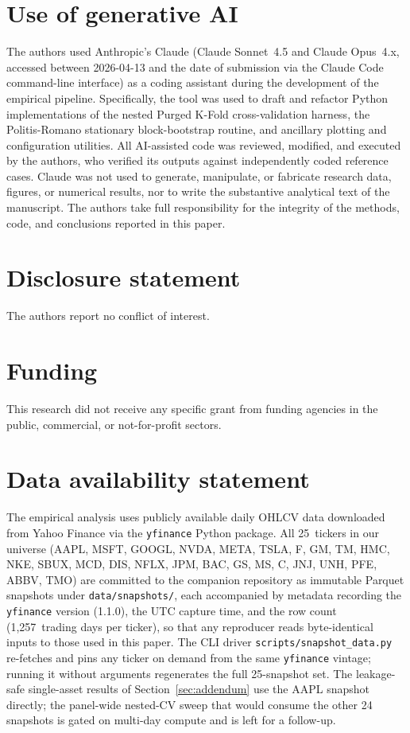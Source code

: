 \documentclass{rQUF2e}
\begin{document}
\section*{Use of generative AI}

The authors used Anthropic's Claude (Claude Sonnet~4.5 and Claude
Opus~4.x, accessed between 2026-04-13 and the date of submission
via the Claude Code command-line interface) as a coding assistant
during the development of the empirical pipeline. Specifically,
the tool was used to draft and refactor Python implementations of
the nested Purged K-Fold cross-validation harness, the
Politis-Romano stationary block-bootstrap routine, and ancillary
plotting and configuration utilities. All AI-assisted code was
reviewed, modified, and executed by the authors, who verified its
outputs against independently coded reference cases. Claude was
not used to generate, manipulate, or fabricate research data,
figures, or numerical results, nor to write the substantive
analytical text of the manuscript. The authors take full
responsibility for the integrity of the methods, code, and
conclusions reported in this paper.

\section*{Disclosure statement}

The authors report no conflict of interest.

\section*{Funding}

This research did not receive any specific grant from funding
agencies in the public, commercial, or not-for-profit sectors.

\section*{Data availability statement}

The empirical analysis uses publicly available daily OHLCV data
downloaded from Yahoo Finance via the \texttt{yfinance} Python
package. All 25~tickers in our universe (AAPL, MSFT, GOOGL, NVDA,
META, TSLA, F, GM, TM, HMC, NKE, SBUX, MCD, DIS, NFLX, JPM, BAC,
GS, MS, C, JNJ, UNH, PFE, ABBV, TMO) are committed to the companion
repository as immutable Parquet snapshots under
\texttt{data/snapshots/}, each accompanied by metadata recording
the \texttt{yfinance} version (1.1.0), the UTC capture time, and
the row count (1{,}257~trading days per ticker), so that any
reproducer reads byte-identical inputs to those used in this paper.
The CLI driver \texttt{scripts/snapshot\_data.py} re-fetches and
pins any ticker on demand from the same \texttt{yfinance} vintage;
running it without arguments regenerates the full 25-snapshot set.
The leakage-safe single-asset results of
Section~\ref{sec:addendum} use the AAPL snapshot directly; the
panel-wide nested-CV sweep that would consume the other 24 snapshots
is gated on multi-day compute and is left for a follow-up.
\end{document}
